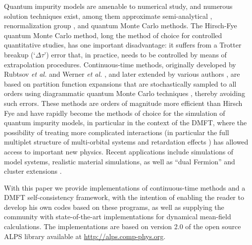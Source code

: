 \documentclass[3p,twocolumn]{elsarticle}
\begin{document}

Quantum impurity models are amenable to numerical study, and numerous solution techniques exist, among them approximate semi-analytical \cite{Georges92,Keiter71,Pruschke89}, renormalization group \cite{NRGRev}, and quantum Monte Carlo methods. The Hirsch-Fye \cite{Hirsch86} quantum Monte Carlo method, long the method of choice for controlled quantitative studies, has one important disadvantage: it suffers from a Trotter breakup (`$\Delta \tau$') error that, in practice, needs to be controlled by means of extrapolation procedures.
Continuous-time methods, originally developed by Rubtsov {\it et al.} \cite{Rubtsov04,Rubtsov05} and Werner {\it et al.} \cite{Werner06}, and later extended by various authors \cite{Werner06Kondo,Haule07,Gull08_ctaux,Gull10_bold,Assaad10}, are based on partition function expansions that are stochastically sampled to all orders using diagrammatic quantum Monte Carlo techniques \cite{Prokofev98,Prokofev98A}, thereby avoiding such errors.
These methods are orders of magnitude more efficient than Hirsch Fye \cite{Gull07} and have rapidly become the methods of choice for the simulation of quantum impurity models, in particular in the context of the DMFT, where the possibility of treating more complicated interactions (in particular the full multiplet structure of multi-orbital systems \cite{Werner06Kondo} and retardation effects \cite{Assaad07,Werner07holstein}) has allowed access to important new physics.
Recent applications include simulations of model systems, realistic material simulations, as well as ``dual Fermion''\cite{Rubtsov08} and cluster extensions \cite{Gull08_plaquette,Werner098site,Gull09_8site}.

With this paper we provide implementations of continuous-time methods and a DMFT self-consistency framework, with the intention of enabling the reader to develop his own codes based on these programs, as well as supplying the community with state-of-the-art implementations for dynamical mean-field calculations. The implementations are based on version 2.0 of the open source ALPS library \cite{ALPS} available at \href{http://alps.comp-phys.org}{http://alps.comp-phys.org}.
\end{document}
